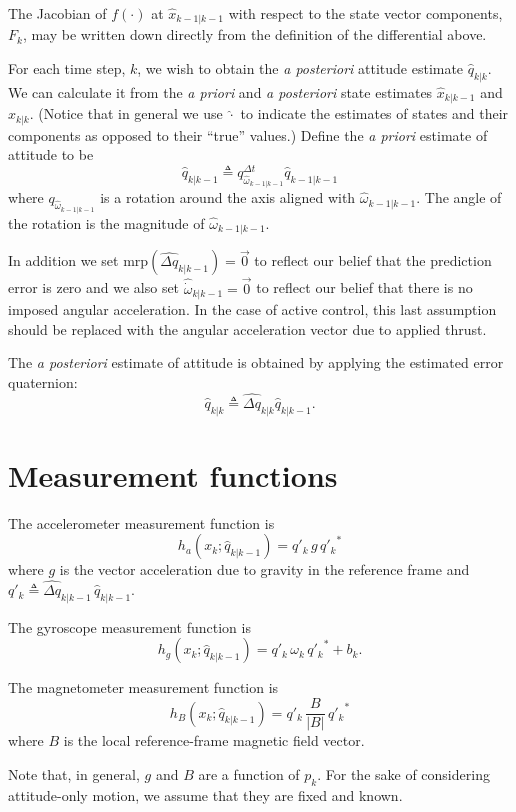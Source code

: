 \documentclass[a4paper]{paper}
\begin{document}
The Jacobian of $f(\cdot)$ at $\hat{x}_{k-1|k-1}$ with respect to the state
vector components, $F_k$, may be written down directly from the definition of
the differential above.

For each time step, $k$, we wish to obtain the \emph{a posteriori} attitude
estimate $\hat{q}_{k|k}$. We can calculate it from the \emph{a priori} and
\emph{a posteriori} state estimates $\hat{x}_{k|k-1}$ and $\hat{x}_{k|k}$.
(Notice that in general we use $\hat{\cdot}$ to indicate the estimates of states
and their components as opposed to their ``true'' values.) Define the \emph{a
priori} estimate of attitude to be
$$
\hat{q}_{k|k-1} \triangleq q^{\Delta t}_{\hat{\omega}_{k-1|k-1}}
\hat{q}_{k-1|k-1}
$$
where $q_{\hat{\omega}_{k-1|k-1}}$ is a rotation around the axis aligned with
$\hat{\omega}_{k-1|k-1}$. The angle of the rotation is the magnitude of
$\hat{\omega}_{k-1|k-1}$.

In addition we set $\mbox{mrp}(\hat{\Delta q}_{k|k-1}) = \vec{0}$ to reflect our
belief that the prediction error is zero and we also set
$\hat{\dot{\omega}}_{k|k-1} = \vec{0}$ to reflect our belief that there is no
imposed angular acceleration. In the case of active control, this last
assumption should be replaced with the angular acceleration vector due to
applied thrust.

The \emph{a posteriori} estimate of attitude is obtained by applying the
estimated error quaternion:
$$
\hat{q}_{k|k} \triangleq \hat{\Delta q}_{k|k} \hat{q}_{k|k-1}.
$$

\section{Measurement functions}

The accelerometer measurement function is
$$
h_a(x_k; \hat{q}_{k|k-1}) = q'_k \, g \, {q'_k}^*
$$
where $g$ is the vector acceleration due to gravity in the reference frame and
$q'_k \triangleq \hat{\Delta q}_{k|k-1} \, \hat{q}_{k|k-1}$. 

The gyroscope measurement function is
$$
h_g(x_k; \hat{q}_{k|k-1}) = q'_k \, \omega_k \, {q'_k}^* + b_k.
$$

The magnetometer measurement function is
$$
h_B(x_k;\hat{q}_{k|k-1}) = q'_k \, \frac{B}{|B|} \, {q'_k}^*
$$
where $B$ is the local reference-frame magnetic field vector.

Note that, in general, $g$ and $B$ are a function of $p_k$. For the sake of
considering attitude-only motion, we assume that they are fixed and known.
\end{document}
